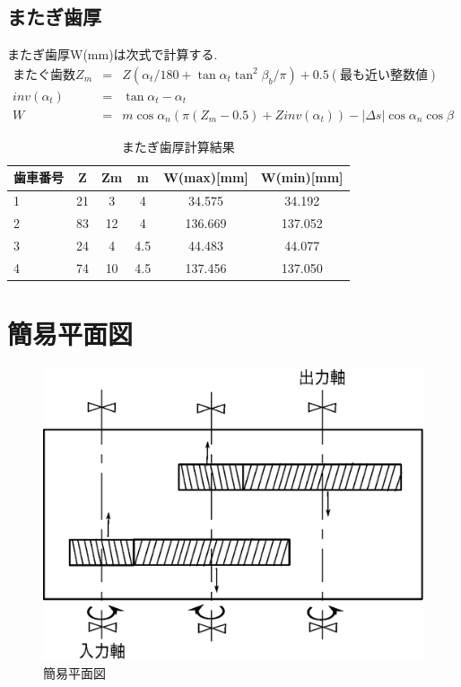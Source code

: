 \documentclass[a4j,twoside,openright,11pt]{jreport}
\begin{document}
\subsection{またぎ歯厚}
またぎ歯厚W(mm)は次式で計算する.
\begin{eqnarray}
またぐ歯数　Z_m &=& Z(\alpha_t/180 + \tan \alpha_t \tan^2 \beta_b/\pi) + 0.5 (最も近い整数値)\\
inv(\alpha_t) &=& \tan \alpha_t - \alpha_t\\
W &=& m\cos \alpha_n(\pi (Z_m - 0.5) + Zinv(\alpha_t)) - | \Delta s |\cos \alpha_n \cos \beta
\end{eqnarray}
\begin{table}[htb]
\begin{center}
  \caption{またぎ歯厚計算結果}
  \begin{tabular}{|l||c|c|c|c|c|} \hline
歯車番号&Z&Zm&m&W(max)[mm]&W(min)[mm]\\\hline
1&21&3 &  4&34.575 & 34.192\\
2&83&12&  4&136.669&137.052\\
3&24&4 &4.5& 44.483& 44.077\\
4&74&10&4.5&137.456&137.050\\
\hline
  \end{tabular}
\end{center}
\end{table}

\section{簡易平面図}
\begin{figure}[htbp]
\begin{center}
\includegraphics[width=12cm]{hagu.eps}
\end{center}
\caption{簡易平面図}
\end{figure}
\end{document}
